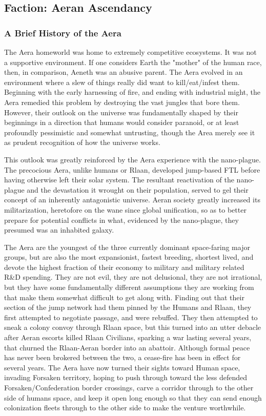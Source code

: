 \subsection{Faction: Aeran Ascendancy}


\subsubsection{A Brief History of the Aera}

The Aera homeworld was home to extremely competitive ecosystems. It
was not a supportive environment. If one considers Earth the "mother"
of the human race, then, in comparison, Aeneth was an abusive
parent. The Aera evolved in an environment where a slew of things
really did want to kill/eat/infest them. Beginning with the early
harnessing of fire, and ending with industrial might, the Aera
remedied this problem by destroying the vast jungles that bore
them. However, their outlook on the universe was fundamentally shaped
by their beginnings in a direction that humans would consider
paranoid, or at least profoundly pessimistic and somewhat untrusting,
though the Area merely see it as prudent recognition of how the
universe works.

This outlook was greatly reinforced by the Aera experience with the
nano-plague. The precocious Aera, unlike humans or Rlaan, developed
jump-based FTL before having otherwise left their solar system. The
resultant reactivation of the nano-plague and the devastation it
wrought on their population, served to gel their concept of an
inherently antagonistic universe. Aeran society greatly increased its
militarization, heretofore on the wane since global unification, so as
to better prepare for potential conflicts in what, evidenced by the
nano-plague, they presumed was an inhabited galaxy.

The Aera are the youngest of the three currently dominant space-faring
major groups, but are also the most expansionist, fastest breeding,
shortest lived, and devote the highest fraction of their economy to
military and military related R\&D spending. They are not evil, they
are not delusional, they are not irrational, but they have some
fundamentally different assumptions they are working from that make
them somewhat difficult to get along with. Finding out that their
section of the jump network had them pinned by the Humans and Rlaan,
they first attempted to negotiate passage, and were rebuffed. They
then attempted to sneak a colony convoy through Rlaan space, but this
turned into an utter debacle after Aeran escorts killed Rlaan
Civilians, sparking a war lasting several years, that churned the
Rlaan-Aeran border into an abattoir. Although formal peace has never
been brokered between the two, a cease-fire has been in effect for
several years. The Aera have now turned their sights toward Human
space, invading Forsaken territory, hoping to push through toward the
less defended Forsaken/Confederation border crossings, carve a
corridor through to the other side of humans space, and keep it open
long enough so that they can send enough colonization fleets through
to the other side to make the venture worthwhile.

